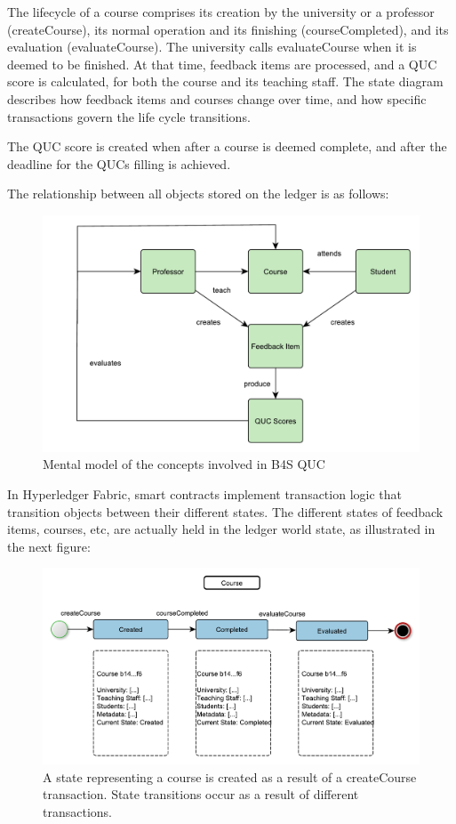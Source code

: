 \documentclass[12pt,a4paper]{article}
\theoremstyle{definition}
\begin{document}
The lifecycle of a course comprises its creation by the university or a professor (createCourse), its normal operation and its finishing (courseCompleted), and its evaluation (evaluateCourse). The university calls evaluateCourse when it is deemed to be finished. At that time, feedback items are processed, and a QUC score is calculated, for both the course and its teaching staff.
The state diagram describes how feedback items and courses change over time, and how specific transactions govern the life cycle transitions. 

The QUC score is created when after a course is deemed complete, and after the deadline for the QUCs filling is achieved.

The relationship between all objects stored on the ledger is as follows:

\begin{figure}[h!]
    \centering
    \includegraphics[scale=0.6]{figures/fig5.pdf}
    \caption{Mental model of the concepts involved in B4S QUC}
    \label{fig:mental_model}
\end{figure}

In Hyperledger Fabric, smart contracts implement transaction logic that transition objects between their different states. The different states of feedback items, courses, etc, are actually held in the ledger world state, as illustrated in the next figure:

\begin{figure}[h!]
    \centering
    \includegraphics[scale=0.6]{figures/fig6.pdf}
    \caption{A state representing a course is created as a result of a createCourse transaction. State transitions occur as a result of different transactions.}
    \label{fig:course_lf_2}
\end{figure}
\end{document}
